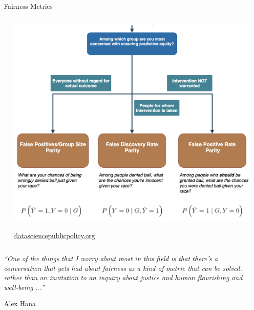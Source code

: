 \begin{vbframe}{Fairness Metrics}
\begin{columns}
\begin{column}{0.5\textwidth}
\end{column}
\begin{column}{0.5\textwidth}  %

    \begin{center}
    \includegraphics[width=\textwidth]{figure_man/fair-aequitas-tree3.png}
        \begin{tiny}
    \href{http://www.datasciencepublicpolicy.org/projects/aequitas/}{datasciencepublicpolicy.org}
    \end{tiny}
    \end{center}

 
\end{column}
\end{columns}
   \vfill

\framebreak 


\framebreak
\null
\vfill
\begin{large}
\textit{\enquote{One of the things that I worry about most in this field is that there’s a conversation that gets had about fairness as a kind of metric that can be solved, rather than an invitation to an inquiry about justice and human flourishing and well-being ...}}\\
\end{large}
Alex Hana
\vfill



\end{vbframe}
